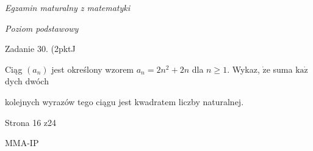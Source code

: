 \documentclass[a4paper,12pt]{article}
\begin{document}
{\it Egzamin maturalny z matematyki}

{\it Poziom podstawowy}

Zadanie 30. (2pktJ

Ciąg $(a_{n})$ jest określony wzorem $a_{n}=2n^{2}+2n$ dla $n\geq 1$. Wykaz, $\dot{\mathrm{z}}\mathrm{e}$ suma $\mathrm{k}\mathrm{a}\dot{\mathrm{z}}$ dych dwóch

kolejnych wyrazów tego ciągu jest kwadratem liczby naturalnej.

Strona 16 z24

MMA-IP
\end{document}
